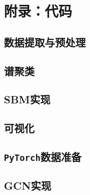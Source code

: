 \section{附录：代码}

\subsection{数据提取与预处理}





\subsection{谱聚类}

\subsection{SBM实现}


\subsection{可视化}


\subsection{\texttt{PyTorch}数据准备}

\subsection{GCN实现}
